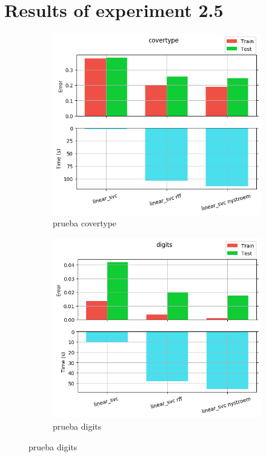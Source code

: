 
\chapter{Results of experiment 2.5} %

\label{Appendix2-5} %

\begin{figure}[ht]
  \centering
  \begin{subfigure}[b]{0.5\linewidth}
    \centering\captionsetup{width=.8\linewidth}\includegraphics[width=\imgscale\linewidth]{Figures/2_5/covertype}
    \caption{prueba covertype}
    \label{fig:2_5_covertype}
  \end{subfigure}%
  \begin{subfigure}[b]{0.5\linewidth}
    \centering\captionsetup{width=.8\linewidth}\includegraphics[width=\imgscale\linewidth]{Figures/2_5/digits}
    \caption{prueba digits}
    \label{fig:2_5_digits}
  \end{subfigure}
\end{figure}


